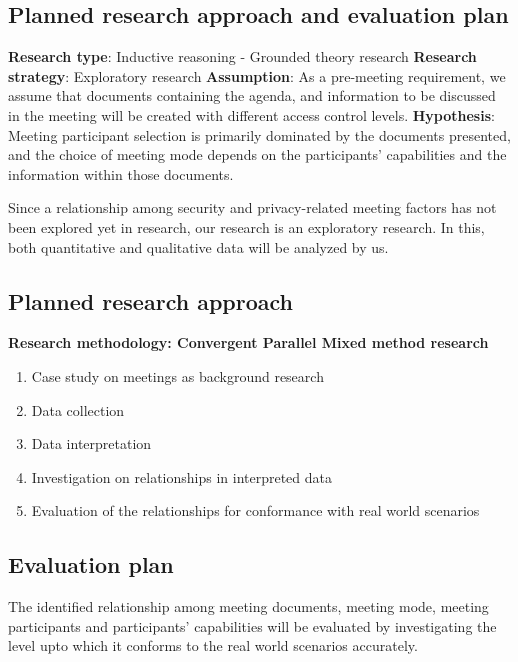 \begin{spacing}{1.0}
    \section{Planned research approach and evaluation plan}

    \textbf{Research type}: Inductive reasoning - Grounded theory research
    \newline\newline \textbf{Research strategy}: Exploratory research
    \newline\newline \textbf{Assumption}: As a pre-meeting requirement, we assume that documents containing the agenda, and information to be discussed in the meeting will be created with different access control levels.
    \newline\newline \textbf{Hypothesis}: Meeting participant selection is primarily dominated by the documents presented, and the choice of meeting mode depends on the participants' capabilities and the information within those documents.
    \newline

    \par Since a relationship among security and privacy-related meeting factors has not been explored yet in research, our research is an exploratory research. In this, both quantitative and qualitative data will be analyzed by us.

    \subsection{Planned research approach}
    \textbf{Research methodology: Convergent Parallel Mixed method research}
    \begin{enumerate}
        \item Case study on meetings as background research
        \item Data collection
        \item Data interpretation
        \item Investigation on relationships in interpreted data
        \item Evaluation of the relationships for conformance with real world scenarios
    \end{enumerate}

    \subsection{Evaluation plan}
    \indent \par The identified relationship among meeting documents, meeting mode, meeting participants and participants’ capabilities will be evaluated by investigating the level upto which it conforms to the real world scenarios accurately.


\end{spacing}

